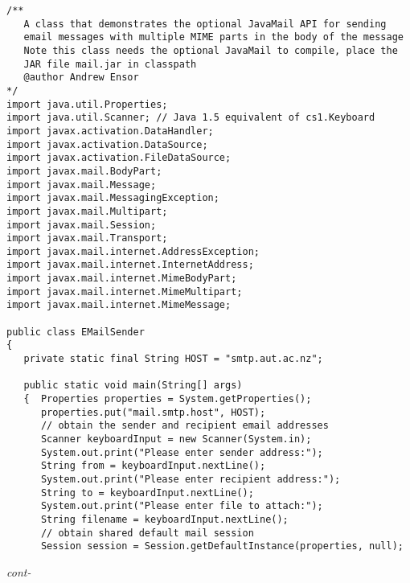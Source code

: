\begin{figure*}\begin{program}\begin{verbatim}
/**
   A class that demonstrates the optional JavaMail API for sending
   email messages with multiple MIME parts in the body of the message
   Note this class needs the optional JavaMail to compile, place the
   JAR file mail.jar in classpath
   @author Andrew Ensor
*/
import java.util.Properties;
import java.util.Scanner; // Java 1.5 equivalent of cs1.Keyboard
import javax.activation.DataHandler;
import javax.activation.DataSource;
import javax.activation.FileDataSource;
import javax.mail.BodyPart;
import javax.mail.Message;
import javax.mail.MessagingException;
import javax.mail.Multipart;
import javax.mail.Session;
import javax.mail.Transport;
import javax.mail.internet.AddressException;
import javax.mail.internet.InternetAddress;
import javax.mail.internet.MimeBodyPart;
import javax.mail.internet.MimeMultipart;
import javax.mail.internet.MimeMessage;

public class EMailSender
{
   private static final String HOST = "smtp.aut.ac.nz";

   public static void main(String[] args)
   {  Properties properties = System.getProperties();
      properties.put("mail.smtp.host", HOST);
      // obtain the sender and recipient email addresses
      Scanner keyboardInput = new Scanner(System.in);
      System.out.print("Please enter sender address:");
      String from = keyboardInput.nextLine();
      System.out.print("Please enter recipient address:");
      String to = keyboardInput.nextLine();
      System.out.print("Please enter file to attach:");
      String filename = keyboardInput.nextLine();
      // obtain shared default mail session
      Session session = Session.getDefaultInstance(properties, null);
\end{verbatim}\hfill \emph{cont-}\end{program}\end{figure*}%
